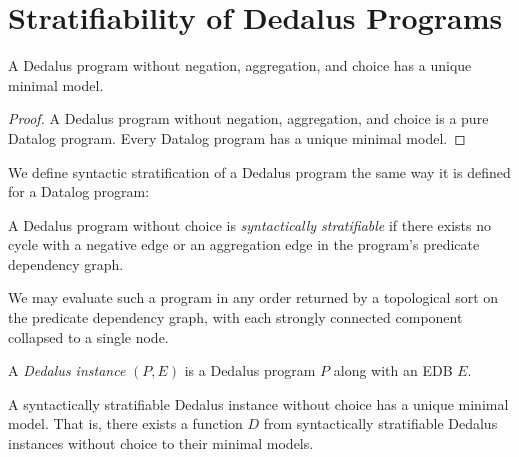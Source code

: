 
\section{Stratifiability of Dedalus Programs}



\begin{lemma} 
%
A Dedalus program without negation, aggregation, and choice has a unique
minimal model.
%
\end{lemma}

\begin{proof} 
%
A Dedalus program without negation, aggregation, and choice is a pure Datalog
program.  Every Datalog program has a unique minimal model. 
%
\end{proof}



We define syntactic stratification of a Dedalus program the same way it is
defined for a Datalog program:

\begin{definition}
%
A Dedalus program without choice is \emph{syntactically stratifiable} if there
exists no cycle with a negative edge or an aggregation edge in the program's
predicate dependency graph.
%
\end{definition}


We may
evaluate such a program in any order returned by a topological sort on the predicate
dependency graph, with each strongly connected component collapsed to a single
node. 

\begin{definition}
%
A {\em Dedalus instance} $(P,E)$ is a Dedalus program $P$ along with an EDB
$E$.
%
\end{definition}

\begin{lemma}
%
A syntactically stratifiable Dedalus instance without choice has a unique
minimal model.  That is, there exists a function $D$ from syntactically
stratifiable Dedalus instances without choice to their minimal models.
%
\end{lemma}


